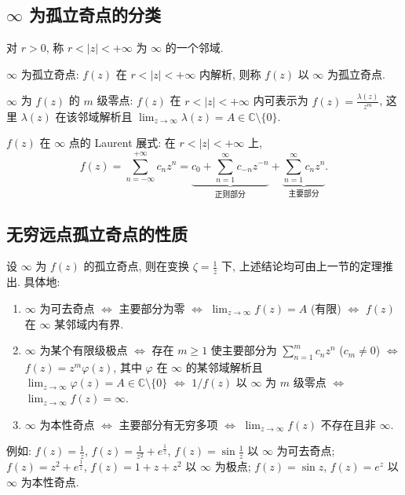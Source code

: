 \documentclass[theorem=false,mathfont=none,openany,sub3section]{easybook}
\begin{document}
\subsection{\texorpdfstring{$\infty$ 为孤立奇点的分类}{无穷远点为孤立奇点的分类}}

\begin{definition}
  对 $r>0$, 称 $r<|z|<+\infty$ 为 $\infty$ 的一个邻域.\par
  $\infty$ 为孤立奇点: $f(z)$ 在 $r<|z|<+\infty$ 内解析, 则称 $f(z)$ 以 $\infty$ 为孤立奇点.\par
  $\infty$ 为 $f(z)$ 的 $m$ 级零点: $f(z)$ 在 $r<|z|<+\infty$ 内可表示为
  $f(z)=\frac{\lambda(z)}{z^{m}}$, 这里 $\lambda(z)$ 在该邻域解析且
  $\lim_{z\to\infty}\lambda(z)=A\in\mathbb C\setminus\{0\}$.
\end{definition}

$f(z)$ 在 $\infty$ 点的 Laurent 展式: 在 $r<|z|<+\infty$ 上,
\[
f(z)=\sum_{n=-\infty}^{+\infty}c_{n}z^{n}
=\underbrace{c_0+\sum_{n=1}^{\infty}c_{-n}z^{-n}}_{\text{正则部分}}
+\underbrace{\sum_{n=1}^{\infty}c_{n}z^{n}}_{\text{主要部分}}.
\]

\subsection{无穷远点孤立奇点的性质}

\begin{theorem}
  设 $\infty$ 为 $f(z)$ 的孤立奇点, 则在变换 $\zeta=\frac{1}{z}$ 下, 上述结论均可由上一节的定理推出. 具体地:
  \begin{enumerate}
    \item $\infty$ 为可去奇点 $\Leftrightarrow$ 主要部分为零 $\Leftrightarrow$ $\lim_{z\to\infty}f(z)=A$ (有限) $\Leftrightarrow$ $f(z)$ 在 $\infty$ 某邻域内有界.
    \item $\infty$ 为某个有限级极点 $\Leftrightarrow$ 存在 $m\geq1$ 使主要部分为 $\sum_{n=1}^{m}c_{n}z^{n}$ ($c_{m}\neq0$)
    $\Leftrightarrow$ $f(z)=z^{m}\varphi(z)$, 其中 $\varphi$ 在 $\infty$ 的某邻域解析且
    $\lim_{z\to\infty}\varphi(z)=A\in\mathbb C\setminus\{0\}$
    $\Leftrightarrow$ $1/f(z)$ 以 $\infty$ 为 $m$ 级零点 $\Leftrightarrow$ $\lim_{z\to\infty}f(z)=\infty$.
    \item $\infty$ 为本性奇点 $\Leftrightarrow$ 主要部分有无穷多项 $\Leftrightarrow$ $\lim_{z\to\infty}f(z)$ 不存在且非 $\infty$.
  \end{enumerate}
\end{theorem}

  例如: $f(z)=\frac{1}{z}$, $f(z)=\frac{1}{z^{2}}+e^{\frac{1}{z}}$, $f(z)=\sin\frac{1}{z}$ 以 $\infty$ 为可去奇点;
  $f(z)=z^{2}+e^{\frac{1}{z}}$, $f(z)=1+z+z^{2}$ 以 $\infty$ 为极点;
  $f(z)=\sin z$, $f(z)=e^{z}$ 以 $\infty$ 为本性奇点.
\end{document}
